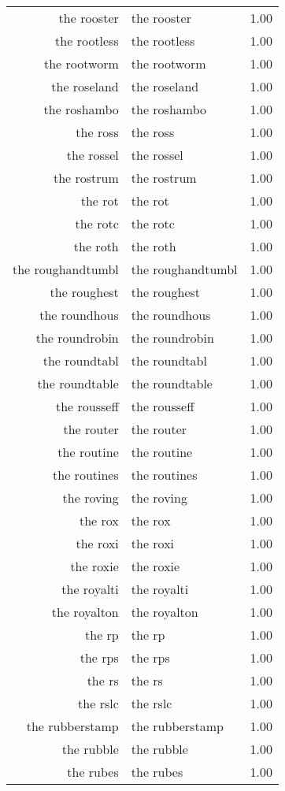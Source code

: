 \begin{table}[ht]
\begin{tabular}{rlr}
  the rooster & the rooster & 1.00 \\ 
  the rootless & the rootless & 1.00 \\ 
  the rootworm & the rootworm & 1.00 \\ 
  the roseland & the roseland & 1.00 \\ 
  the roshambo & the roshambo & 1.00 \\ 
  the ross & the ross & 1.00 \\ 
  the rossel & the rossel & 1.00 \\ 
  the rostrum & the rostrum & 1.00 \\ 
  the rot & the rot & 1.00 \\ 
  the rotc & the rotc & 1.00 \\ 
  the roth & the roth & 1.00 \\ 
  the roughandtumbl & the roughandtumbl & 1.00 \\ 
  the roughest & the roughest & 1.00 \\ 
  the roundhous & the roundhous & 1.00 \\ 
  the roundrobin & the roundrobin & 1.00 \\ 
  the roundtabl & the roundtabl & 1.00 \\ 
  the roundtable & the roundtable & 1.00 \\ 
  the rousseff & the rousseff & 1.00 \\ 
  the router & the router & 1.00 \\ 
  the routine & the routine & 1.00 \\ 
  the routines & the routines & 1.00 \\ 
  the roving & the roving & 1.00 \\ 
  the rox & the rox & 1.00 \\ 
  the roxi & the roxi & 1.00 \\ 
  the roxie & the roxie & 1.00 \\ 
  the royalti & the royalti & 1.00 \\ 
  the royalton & the royalton & 1.00 \\ 
  the rp & the rp & 1.00 \\ 
  the rps & the rps & 1.00 \\ 
  the rs & the rs & 1.00 \\ 
  the rslc & the rslc & 1.00 \\ 
  the rubberstamp & the rubberstamp & 1.00 \\ 
  the rubble & the rubble & 1.00 \\ 
  the rubes & the rubes & 1.00 \\ 

\end{tabular}
\end{table}
